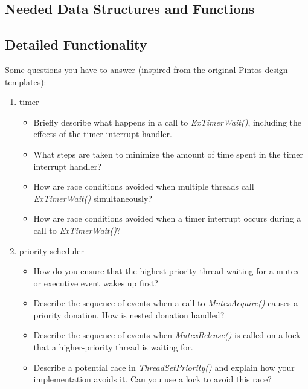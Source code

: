 \subsection{Needed Data Structures and Functions}



\subsection{Detailed Functionality}

Some questions you have to answer (inspired from the original Pintos design templates):
\begin{enumerate}
    \item timer
        \begin{itemize}
            \item Briefly describe what happens in a call to \textit{ExTimerWait()}, including the effects of the timer interrupt handler.
            \item What steps are taken to minimize the amount of time spent in the timer interrupt handler?
            \item How are race conditions avoided when multiple threads call \textit{ExTimerWait()} simultaneously?
            \item How are race conditions avoided when a timer interrupt occurs during a call to \textit{ExTimerWait()}?
        \end{itemize}
    
    \item priority scheduler
        \begin{itemize}
            \item How do you ensure that the highest priority thread waiting for a mutex or executive event wakes up first?
    
            \item Describe the sequence of events when a call to \textit{MutexAcquire()} causes a priority donation.  How is nested donation handled?
            
            \item Describe the sequence of events when \textit{MutexRelease()} is called on a lock that a higher-priority thread is waiting for.
            
            \item Describe a potential race in \textit{ThreadSetPriority()} and explain how your implementation avoids it.  Can you use a lock to avoid this race?
        \end{itemize}


\end{enumerate}
